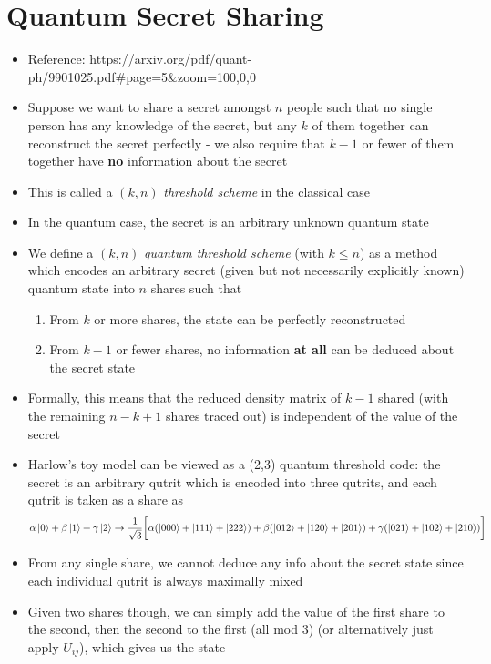 \documentclass[12pt,a4paper]{article}
\numberwithin{equation}{section}
\begin{document}
	\section{Quantum Secret Sharing}
	\begin{itemize}
		\item Reference: https://arxiv.org/pdf/quant-ph/9901025.pdf\#page=5\&zoom=100,0,0
		\item Suppose we want to share a secret amongst $n$ people such that no single person has any knowledge of the secret, but any $k$ of them together can reconstruct the secret perfectly - we also require that $k-1$ or fewer of them together have \textbf{no} information about the secret
		\item This is called a $(k,n)$ \textit{threshold scheme} in the classical case
		\item In the quantum case, the secret is an arbitrary unknown quantum state
		\item We define a $(k,n)$ \textit{quantum threshold scheme} (with $k\leq n$) as a method which encodes an arbitrary secret (given but not necessarily explicitly known) quantum state into $n$ shares such that
		\begin{enumerate}
			\item From $k$ or more shares, the state can be perfectly reconstructed
			\item From $k-1$ or fewer shares, no information \textbf{at all} can be deduced about the secret state
		\end{enumerate}
		\item Formally, this means that the reduced density matrix of $k-1$ shared (with the remaining $n-k+1$ shares traced out) is independent of the value of the secret
		\item Harlow's toy model can be viewed as a (2,3) quantum threshold code: the secret is an arbitrary qutrit which is encoded into three qutrits, and each qutrit is taken as a share as
		\begin{equation}
			\alpha\ket{0}+\beta\ket{1}+\gamma\ket{2}\to\frac{1}{\sqrt{3}}\bigg[\alpha(\ket{000}+\ket{111}+\ket{222})+\beta(\ket{012}+\ket{120}+\ket{201})+\gamma(\ket{021}+\ket{102}+\ket{210})\bigg]
		\end{equation}
		\item From any single share, we cannot deduce any info about the secret state since each individual qutrit is always maximally mixed
		\item Given two shares though, we can simply add the value of the first share to the second, then the second to the first (all mod 3) (or alternatively just apply $U_{ij}$), which gives us the state

\end{itemize}
\end{document}
